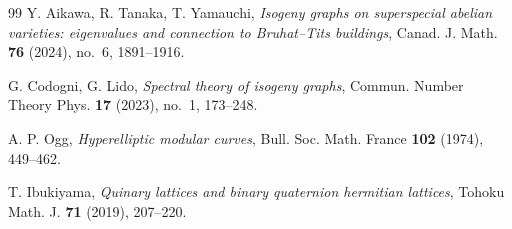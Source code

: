 \documentclass[11pt]{amsart}
\theoremstyle{plain}
\theoremstyle{definition}
\begin{document}
\begin{thebibliography}{99}
		 Y. Aikawa, R. Tanaka, T. Yamauchi, \emph{Isogeny
			graphs on superspecial abelian varieties: eigenvalues and connection to
			Bruhat--Tits buildings}, Canad. J. Math. \textbf{76} (2024), no.~6, 1891--1916.
		
		 G. Codogni, G. Lido, \emph{Spectral theory of isogeny
			graphs}, Commun. Number Theory Phys. \textbf{17} (2023), no.~1, 173--248.
		
		 A. P. Ogg, \emph{Hyperelliptic modular curves}, Bull. Soc. Math. France \textbf{102} (1974), 449--462.
		
		 T. Ibukiyama, \emph{Quinary lattices and binary quaternion hermitian lattices}, Tohoku Math. J. \textbf{71} (2019), 207--220.
		
	\end{thebibliography}
	
\end{document}
